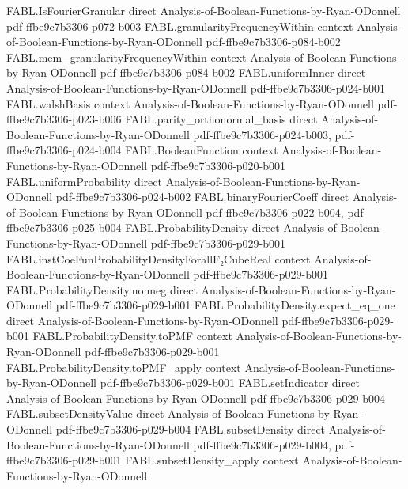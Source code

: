 \begin{theorem}
\proofstep
  {FABL.IsFourierGranular}
  {direct}
  {Analysis-of-Boolean-Functions-by-Ryan-ODonnell}
  {pdf-ffbe9c7b3306-p072-b003}
\proofstep
  {FABL.granularityFrequencyWithin}
  {context}
  {Analysis-of-Boolean-Functions-by-Ryan-ODonnell}
  {pdf-ffbe9c7b3306-p084-b002}
\proofstep
  {FABL.mem_granularityFrequencyWithin}
  {context}
  {Analysis-of-Boolean-Functions-by-Ryan-ODonnell}
  {pdf-ffbe9c7b3306-p084-b002}
\proofstep
  {FABL.uniformInner}
  {direct}
  {Analysis-of-Boolean-Functions-by-Ryan-ODonnell}
  {pdf-ffbe9c7b3306-p024-b001}
\proofstep
  {FABL.walshBasis}
  {context}
  {Analysis-of-Boolean-Functions-by-Ryan-ODonnell}
  {pdf-ffbe9c7b3306-p023-b006}
\proofstep
  {FABL.parity_orthonormal_basis}
  {direct}
  {Analysis-of-Boolean-Functions-by-Ryan-ODonnell}
  {pdf-ffbe9c7b3306-p024-b003,
    pdf-ffbe9c7b3306-p024-b004}
\proofstep
  {FABL.BooleanFunction}
  {context}
  {Analysis-of-Boolean-Functions-by-Ryan-ODonnell}
  {pdf-ffbe9c7b3306-p020-b001}
\proofstep
  {FABL.uniformProbability}
  {direct}
  {Analysis-of-Boolean-Functions-by-Ryan-ODonnell}
  {pdf-ffbe9c7b3306-p024-b002}
\proofstep
  {FABL.binaryFourierCoeff}
  {direct}
  {Analysis-of-Boolean-Functions-by-Ryan-ODonnell}
  {pdf-ffbe9c7b3306-p022-b004,
    pdf-ffbe9c7b3306-p025-b004}
\proofstep
  {FABL.ProbabilityDensity}
  {direct}
  {Analysis-of-Boolean-Functions-by-Ryan-ODonnell}
  {pdf-ffbe9c7b3306-p029-b001}
\proofstep
  {FABL.instCoeFunProbabilityDensityForallF₂CubeReal}
  {context}
  {Analysis-of-Boolean-Functions-by-Ryan-ODonnell}
  {pdf-ffbe9c7b3306-p029-b001}
\proofstep
  {FABL.ProbabilityDensity.nonneg}
  {direct}
  {Analysis-of-Boolean-Functions-by-Ryan-ODonnell}
  {pdf-ffbe9c7b3306-p029-b001}
\proofstep
  {FABL.ProbabilityDensity.expect_eq_one}
  {direct}
  {Analysis-of-Boolean-Functions-by-Ryan-ODonnell}
  {pdf-ffbe9c7b3306-p029-b001}
\proofstep
  {FABL.ProbabilityDensity.toPMF}
  {context}
  {Analysis-of-Boolean-Functions-by-Ryan-ODonnell}
  {pdf-ffbe9c7b3306-p029-b001}
\proofstep
  {FABL.ProbabilityDensity.toPMF_apply}
  {context}
  {Analysis-of-Boolean-Functions-by-Ryan-ODonnell}
  {pdf-ffbe9c7b3306-p029-b001}
\proofstep
  {FABL.setIndicator}
  {direct}
  {Analysis-of-Boolean-Functions-by-Ryan-ODonnell}
  {pdf-ffbe9c7b3306-p029-b004}
\proofstep
  {FABL.subsetDensityValue}
  {direct}
  {Analysis-of-Boolean-Functions-by-Ryan-ODonnell}
  {pdf-ffbe9c7b3306-p029-b004}
\proofstep
  {FABL.subsetDensity}
  {direct}
  {Analysis-of-Boolean-Functions-by-Ryan-ODonnell}
  {pdf-ffbe9c7b3306-p029-b004,
    pdf-ffbe9c7b3306-p029-b001}
\proofstep
  {FABL.subsetDensity_apply}
  {context}
  {Analysis-of-Boolean-Functions-by-Ryan-ODonnell}

\end{theorem}
